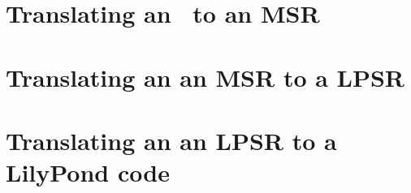 \documentclass[12pt,a4paper]{article}
\begin{document}
\section{Translating an \mxmlt\ to an MSR}


\section{Translating an an MSR to a LPSR}


\section{Translating an an LPSR to a LilyPond code}





\end{document}
